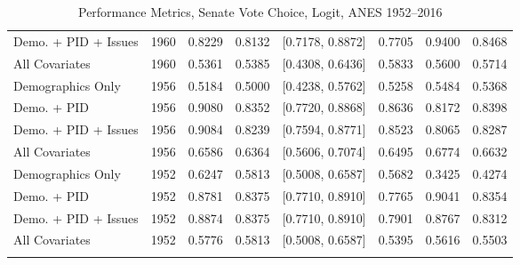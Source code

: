 \begin{longtable}{lrrrlrrr}
  Demo. + PID + Issues & 1960 & 0.8229 & 0.8132 & [0.7178, 0.8872] & 0.7705 & 0.9400 & 0.8468 \\ 
  All Covariates & 1960 & 0.5361 & 0.5385 & [0.4308, 0.6436] & 0.5833 & 0.5600 & 0.5714 \\ 
  Demographics Only & 1956 & 0.5184 & 0.5000 & [0.4238, 0.5762] & 0.5258 & 0.5484 & 0.5368 \\ 
  Demo. + PID & 1956 & 0.9080 & 0.8352 & [0.7720, 0.8868] & 0.8636 & 0.8172 & 0.8398 \\ 
  Demo. + PID + Issues & 1956 & 0.9084 & 0.8239 & [0.7594, 0.8771] & 0.8523 & 0.8065 & 0.8287 \\ 
  All Covariates & 1956 & 0.6586 & 0.6364 & [0.5606, 0.7074] & 0.6495 & 0.6774 & 0.6632 \\ 
  Demographics Only & 1952 & 0.6247 & 0.5813 & [0.5008, 0.6587] & 0.5682 & 0.3425 & 0.4274 \\ 
  Demo. + PID & 1952 & 0.8781 & 0.8375 & [0.7710, 0.8910] & 0.7765 & 0.9041 & 0.8354 \\ 
  Demo. + PID + Issues & 1952 & 0.8874 & 0.8375 & [0.7710, 0.8910] & 0.7901 & 0.8767 & 0.8312 \\ 
  All Covariates & 1952 & 0.5776 & 0.5813 & [0.5008, 0.6587] & 0.5395 & 0.5616 & 0.5503 \\ 
   \bottomrule
\caption{Performance Metrics, Senate Vote Choice, Logit, ANES 1952--2016} 
\label{tab:ANES_senate_logit}
\end{longtable}
